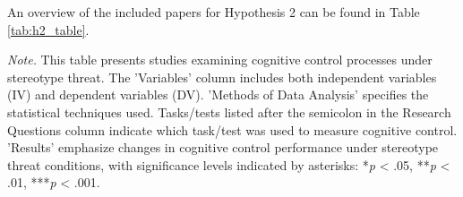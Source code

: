 \documentclass[
  stu, a4paper,floatsintext]{apa7}
\newenvironment{lltable}{\begin{landscape}\centering\begin{ThreePartTable}}{\end{ThreePartTable}\end{landscape}}
\begin{document}
An overview of the included papers for Hypothesis 2 can be found in Table \ref{tab:h2_table}.

\begin{lltable}

\begin{TableNotes}[para]
\normalsize{\textit{Note.} This table presents studies examining cognitive control processes under stereotype threat. The 'Variables' column includes both independent variables (IV) and dependent variables (DV). 'Methods of Data Analysis' specifies the statistical techniques used. Tasks/tests listed after the semicolon in the Research Questions column indicate which task/test was used to measure cognitive control. 'Results' emphasize changes in cognitive control performance under stereotype threat conditions, with significance levels indicated by asterisks: *\textit{p} < .05, **\textit{p} < .01, ***\textit{p} < .001.}
\end{TableNotes}

\small{

}
\end{lltable}
\end{document}

